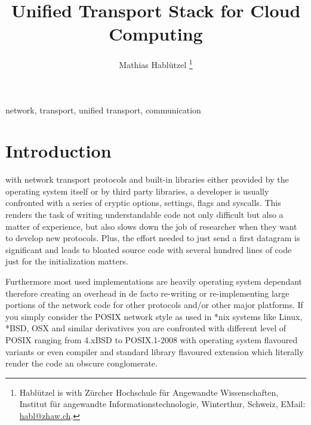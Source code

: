 \documentclass[twocolumn,english]{IEEEtran}
\theoremstyle{plain}
\theoremstyle{plain}
\begin{document}
\title{Unified Transport Stack for Cloud Computing}

\author{Mathias Hablützel \thanks{Hablützel is with Zürcher Hochschule für Angewandte Wissenschaften, Institut für
    angewandte Informationstechnologie, Winterthur, Schweiz, EMail:
    \protect\href{mailto:mathias.habluetzel@zhaw.ch}{habl@zhaw.ch}.
    }
}








\maketitle
\begin{abstract}

\end{abstract}
\begin{IEEEkeywords}
network, transport, unified transport, communication
\end{IEEEkeywords}


\section{Introduction}

 with network transport protocols and built-in
libraries either provided by the operating system itself or by third party
libraries, a developer is usually confronted with a series of cryptic options,
settings, flags and syscalls. This renders the task of writing understandable
code not only difficult but also a matter of experience, but also slows down
the job of researcher when they want to develop new protocols. Plus, the
effort needed to just send a first datagram is significant and leads to
bloated source code with several hundred lines of code just for the
initialization matters.

Furthermore most used implementations are heavily operating system dependant
therefore creating an overhead in de facto re-writing or re-implementing large
portions of the network code for other protocols and/or other major platforms.
If you simply consider the POSIX network style as used in *nix systems like
Linux, *BSD, OSX and similar derivatives you are confronted with different
level of POSIX ranging from 4.xBSD to POSIX.1-2008 with operating system
flavoured variants or even compiler and standard library flavoured extension
which literally render the code an obscure conglomerate.
\end{document}

